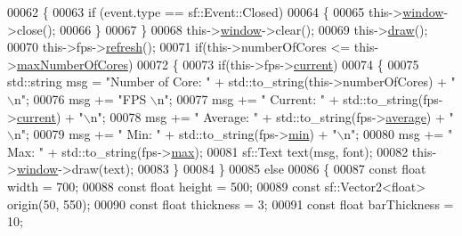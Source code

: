\begin{DoxyCode}
00062         \{
00063             \textcolor{keywordflow}{if} (event.type == sf::Event::Closed)
00064             \{
00065                 this->\hyperlink{classdsf_1_1sfml_1_1_render_window_a2c04b61ca1bfba140120001c4a9a30e1}{window}->close();
00066             \}
00067         \}
00068         this->\hyperlink{classdsf_1_1sfml_1_1_render_window_a2c04b61ca1bfba140120001c4a9a30e1}{window}->clear();
00069         this->\hyperlink{class_my_d_s_f_a148c79b6e221ade1184c2f6f0b9abad5}{draw}();
00070         this->fps->\hyperlink{class_f_p_s_aa143312d7f24775fc5d829efa3878c83}{refresh}();
00071         \textcolor{keywordflow}{if}(this->numberOfCores <= this->\hyperlink{class_my_d_s_f_a3ca13f96cce426bc99251a5b27616e16}{maxNumberOfCores})
00072         \{
00073             \textcolor{keywordflow}{if}(this->fps->\hyperlink{class_f_p_s_ada217de2ec2b66f8485fdbf70ee33675}{current})
00074             \{
00075                 std::string msg = \textcolor{stringliteral}{"Number of Core: "} + std::to\_string(this->numberOfCores) + \textcolor{stringliteral}{"\(\backslash\)n"};
00076                 msg += \textcolor{stringliteral}{"FPS \(\backslash\)n"};
00077                 msg += \textcolor{stringliteral}{" Current: "} + std::to\_string(fps->\hyperlink{class_f_p_s_ada217de2ec2b66f8485fdbf70ee33675}{current}) + \textcolor{stringliteral}{"\(\backslash\)n"};
00078                 msg += \textcolor{stringliteral}{" Average: "} + std::to\_string(fps->\hyperlink{class_f_p_s_a5724af794ec15040b8b101dd0c547893}{average}) + \textcolor{stringliteral}{"\(\backslash\)n"};
00079                 msg += \textcolor{stringliteral}{" Min: "} + std::to\_string(fps->\hyperlink{class_f_p_s_af873eaf0d65931baa5f58415f024ccf7}{min}) + \textcolor{stringliteral}{"\(\backslash\)n"};
00080                 msg += \textcolor{stringliteral}{" Max: "} + std::to\_string(fps->\hyperlink{class_f_p_s_afdca12a152cef9df305e78d8d05ce518}{max});
00081                 sf::Text text(msg, font);
00082                 this->\hyperlink{classdsf_1_1sfml_1_1_render_window_a2c04b61ca1bfba140120001c4a9a30e1}{window}->draw(text);
00083             \}
00084         \}
00085         \textcolor{keywordflow}{else}
00086         \{
00087             \textcolor{keyword}{const} \textcolor{keywordtype}{float} width = 700;
00088             \textcolor{keyword}{const} \textcolor{keywordtype}{float} height = 500;
00089             \textcolor{keyword}{const} sf::Vector2<float> origin(50, 550);
00090             \textcolor{keyword}{const} \textcolor{keywordtype}{float} thickness = 3;
00091             \textcolor{keyword}{const} \textcolor{keywordtype}{float} barThickness = 10;

\end{DoxyCode}
